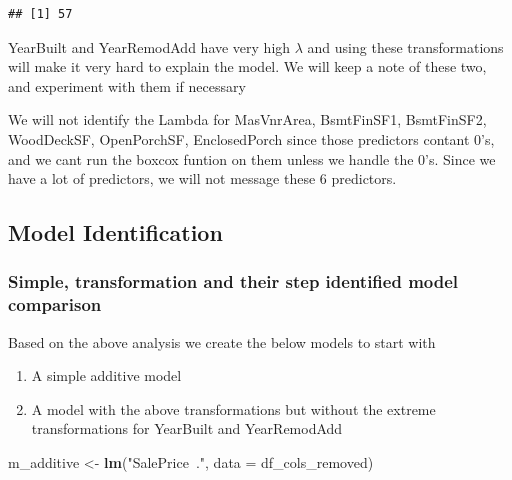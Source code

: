 \documentclass[
]{article}
\newenvironment{Shaded}{\begin{snugshade}}{\end{snugshade}}
\newcommand{\DataTypeTok}[1]{\textcolor[rgb]{0.13,0.29,0.53}{#1}}
\newcommand{\KeywordTok}[1]{\textcolor[rgb]{0.13,0.29,0.53}{\textbf{#1}}}
\newcommand{\NormalTok}[1]{#1}
\newcommand{\OperatorTok}[1]{\textcolor[rgb]{0.81,0.36,0.00}{\textbf{#1}}}
\newcommand{\StringTok}[1]{\textcolor[rgb]{0.31,0.60,0.02}{#1}}
\providecommand{\tightlist}{%
  \setlength{\itemsep}{0pt}\setlength{\parskip}{0pt}}
\begin{document}
\begin{Shaded}
\end{Shaded}

\begin{verbatim}
## [1] 57
\end{verbatim}

YearBuilt and YearRemodAdd have very high \(\lambda\) and using these transformations will make it very hard to explain the model. We will keep a note of these two, and experiment with them if necessary

We will not identify the Lambda for MasVnrArea, BsmtFinSF1, BsmtFinSF2, WoodDeckSF, OpenPorchSF, EnclosedPorch since those predictors contant 0's, and we cant run the boxcox funtion on them unless we handle the 0's. Since we have a lot of predictors, we will not message these 6 predictors.

\hypertarget{model-identification}{%
\subsection{Model Identification}\label{model-identification}}

\hypertarget{simple-transformation-and-their-step-identified-model-comparison}{%
\subsubsection{Simple, transformation and their step identified model comparison}\label{simple-transformation-and-their-step-identified-model-comparison}}

Based on the above analysis we create the below models to start with

\begin{enumerate}
\def\labelenumi{\arabic{enumi})}
\tightlist
\item
  A simple additive model
\item
  A model with the above transformations but without the extreme transformations for YearBuilt and YearRemodAdd
\end{enumerate}

\begin{Shaded}
\begin{Highlighting}[]
\NormalTok{m_additive <-}\StringTok{ }\KeywordTok{lm}\NormalTok{(}\StringTok{"SalePrice~."}\NormalTok{, }\DataTypeTok{data =}\NormalTok{ df_cols_removed)}
\end{Highlighting}
\end{Shaded}
\end{document}
